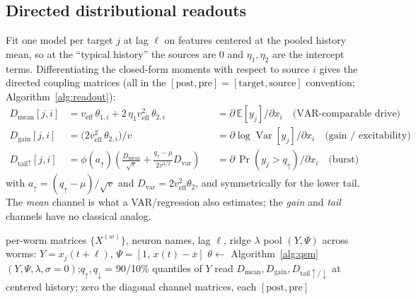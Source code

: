 \documentclass[11pt]{article}
\newcommand{\Var}{\operatorname{Var}}
\newcommand{\E}{\mathbb{E}}
\begin{document}
\subsection{Directed distributional readouts}
Fit one model per target $j$ at lag $\ell$ on features centered at the pooled history mean, so at the
``typical history'' the sources are $0$ and $\eta_1,\eta_2$ are the intercept terms. Differentiating
the closed-form moments with respect to source $i$ gives the directed coupling matrices (all in the
$[\text{post},\text{pre}]=[\text{target},\text{source}]$ convention; Algorithm~\ref{alg:readout}):
\[
\begin{aligned}
D_{\text{mean}}[j,i] &= v_{\mathrm{eff}}\,\theta_{1,i} + 2\,\eta_1 v_{\mathrm{eff}}^2\,\theta_{2,i}
   &&= \partial\,\E[y_j]/\partial x_i \quad\text{(VAR-comparable drive)}\\
D_{\text{gain}}[j,i] &= \bigl(2 v_{\mathrm{eff}}^2\,\theta_{2,i}\bigr)/v
   &&= \partial\log\Var[y_j]/\partial x_i \quad\text{(gain / excitability)}\\
D_{\text{tail}\uparrow}[j,i] &= \phi(a_{\uparrow})\!\left(\tfrac{D_{\text{mean}}}{\sqrt v}
   + \tfrac{q_{\uparrow}-\mu}{2 v^{3/2}} D_{\text{var}}\right)
   &&= \partial\,\Pr(y_j>q_{\uparrow})/\partial x_i \quad\text{(burst)}
\end{aligned}
\]
with $a_{\uparrow}=(q_{\uparrow}-\mu)/\sqrt v$ and $D_{\text{var}}=2v_{\mathrm{eff}}^2\theta_2$, and
symmetrically for the lower tail. The \emph{mean} channel is what a VAR/regression also estimates; the
\emph{gain} and \emph{tail} channels have no classical analog.

\begin{algorithm}[t]
\caption{Directed distributional connectome at lag $\ell$ (closed-form SID)}
\label{alg:readout}
\begin{algorithmic}[1]
\Require per-worm matrices $\{X^{(w)}\}$, neuron names, lag $\ell$, ridge $\lambda$
  \State pool $(Y,\Psi)$ across worms: $Y=x_j(t{+}\ell)$, $\Psi=[1,\,x(t)-\overline{x}]$ 
  \State $\theta \gets$ Algorithm~\ref{alg:qsm}$(Y,\Psi,\lambda,\sigma{=}0)$;\quad $q_\uparrow,q_\downarrow$ = 90/10\% quantiles of $Y$
  \State read $D_{\text{mean}},D_{\text{gain}},D_{\text{tail}\uparrow/\downarrow}$ at centered history; zero the diagonal
\EndFor
\State \Return channel matrices, each $[\text{post},\text{pre}]$
\end{algorithmic}
\end{algorithm}
\end{document}
